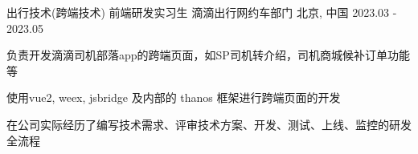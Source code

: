 

\begin{cventries}

    \cventry
    {出行技术(跨端技术) \hspace{1mm} 前端研发实习生} %
    {滴滴出行\hspace{1mm}网约车部门} %
    {北京, 中国} %
    {2023.03 - 2023.05} %
    {
        \begin{cvitems} %
            \item {负责开发滴滴司机部落app的跨端页面，如SP司机转介绍，司机商城候补订单功能等}
            \item {使用vue2, weex, jsbridge 及内部的 thanos 框架进行跨端页面的开发}
            \item {在公司实际经历了编写技术需求、评审技术方案、开发、测试、上线、监控的研发全流程}
        \end{cvitems}
    }

\end{cventries}
